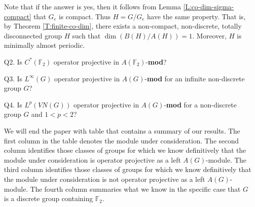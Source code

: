 \documentclass[10pt]{amsart}
\numberwithin{thm}{section}
\numberwithin{equation}{section}
\begin{document}
Note that if the answer is yes, then it follows from Lemma \ref{L:co-dim-sigma-compact} that 
$G_e$ is compact. Thus $H=G / G_e$ have the same property. That is, by Theorem \ref{T:finite-co-dim},
there exists a non-compact, non-discrete, totally disconnected group $H$ such that 
$\dim(B(H)/A(H))=1$. Moreover, $H$ is minimally almost periodic.
\vspace{0.5cm}

Q2. Is $C^*(\mathbb{F}_2)$ operator projective in $A(\mathbb{F}_2)$-{\textbf{mod}}?
\vspace{0.5cm}

Q3. Is $L^\infty(G)$ operator projective in $A(G)$-{\bf mod} for an infinite non-discrete group $G$?
\vspace{0.5cm}

Q4. Is $L^p(VN(G))$ operator projective in $A(G)$-{\bf mod} for a non-discrete group $G$ and $1<p<2$?
\vspace{0.5cm}

We will end the paper with table that contains a summary of our results. The first column in the table denotes the module 
under consideration. The second column identifies those classes of groups for which we know 
definitively that the module under consideration is operator projective as a left $A(G)$-module.
The third column identifies those classes of groups for which we know 
definitively that the module under consideration is not operator projective as a left $A(G)$-module.
The fourth column summaries what we know in the specific case 
that $G$ is a discrete group containing $\mathbb{F}_2$.
\vspace{0.5cm}
  
\end{document}
